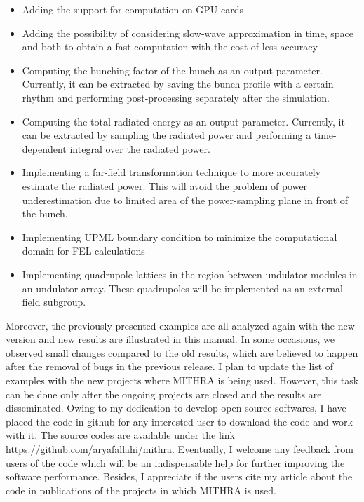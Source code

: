 %
\begin{itemize}
	\setlength{\parskip}{0pt}
	\setlength{\itemsep}{0pt plus 1pt}
	\item Adding the support for computation on GPU cards
	\item Adding the possibility of considering slow-wave approximation in time, space and both to obtain a fast computation with the cost of less accuracy
	\item Computing the bunching factor of the bunch as an output parameter. Currently, it can be extracted by saving the bunch profile with a certain rhythm and performing post-processing separately after the simulation.
	\item Computing the total radiated energy as an output parameter. Currently, it can be extracted by sampling the radiated power and performing a time-dependent integral over the radiated power.
	\item Implementing a far-field transformation technique to more accurately estimate the radiated power. This will avoid the problem of power underestimation due to limited area of the power-sampling plane
	 in front of the bunch.
	\item Implementing UPML boundary condition to minimize the computational domain for FEL calculations
	\item Implementing quadrupole lattices in the region between undulator modules in an undulator array. These quadrupoles will be implemented as an external field subgroup. 
\end{itemize}
%
Moreover, the previously presented examples are all analyzed again with the new version and new results are illustrated in this manual.
%
In some occasions, we observed small changes compared to the old results, which are believed to happen after the removal of bugs in the previous release.
%
I plan to update the list of examples with the new projects where MITHRA is being used.
%
However, this task can be done only after the ongoing projects are closed and the results are disseminated.
%
Owing to my dedication to develop open-source softwares, I have placed the code in github for any interested user to download the code and work with it.
%
The source codes are available under the link \href{https://github.com/aryafallahi/mithra}{https://github.com/aryafallahi/mithra}.
%
Eventually, I welcome any feedback from users of the code which will be an indispensable help for further improving the software performance.
%
Besides, I appreciate if the users cite my article about the code \cite{fallahi2018mithra} in publications of the projects in which MITHRA is used.